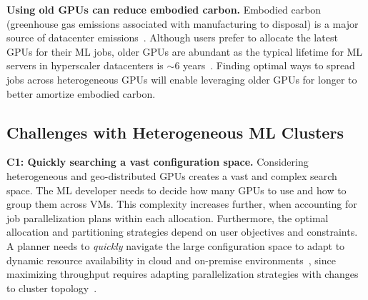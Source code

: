 \textbf{Using old GPUs can reduce embodied carbon.} Embodied carbon (greenhouse gas emissions associated with manufacturing to disposal) is a major source of datacenter  emissions~\cite{greenSKU, carbonExplorer, metaEmbodiedCarbon}.
Although users prefer to allocate the latest GPUs for their ML jobs, older GPUs are abundant as the typical lifetime for ML servers in hyperscaler datacenters is $\sim$6 years~\cite{schneider2025lifecycleGoogleAI, greenSKU}. Finding optimal ways to spread jobs across heterogeneous GPUs will enable leveraging older GPUs for longer to better amortize embodied carbon. 


\subsection{Challenges with Heterogeneous ML Clusters}\label{challenges}

\textbf{C1: Quickly searching a vast configuration space.} 
Considering heterogeneous and geo-distributed GPUs creates a vast and complex search space.
The ML developer needs to decide how many GPUs to use and how to group them across VMs.
This complexity increases further, when accounting for job parallelization plans within each allocation. Furthermore, the optimal allocation and partitioning strategies depend on user objectives and constraints.
A planner needs to \textit{quickly} navigate the large configuration space to adapt to dynamic resource availability in cloud and on-premise environments~\cite{Thorpe23Bamboo, guo2024cephalo, weng22mlaas, Gu19Tiresias}, since maximizing throughput requires adapting parallelization strategies with changes to cluster topology~\cite{Athlur22Varuna, wagenlander24tenplex}. 


